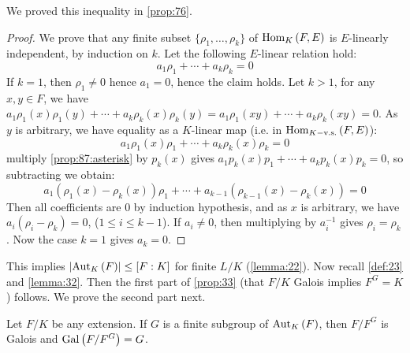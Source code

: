 We proved this inequality in \autoref{prop:76}.

\begin{proof}
  We prove that any finite subset $\{ \rho_1, \ldots, \rho_k \}$ of $\homset{F}{E}$ is $E$-linearly independent, by induction on $k$. Let the following $E$-linear relation hold: 
\[
a_1\rho_1 + \cdots + a_k\rho_k = 0 \tag{*} \label{prop:87:asterisk}
\] If $k = 1$, then $\rho_1 \neq 0$ hence $a_1 = 0$, hence the claim holds. Let $k > 1$, for any $x, y \in F$, we have $a_1\rho_1(x)\rho_1(y) + \cdots + a_k\rho_k(x)\rho_k(y) = a_1\rho_1(xy) + \cdots + a_k\rho_k(xy) = 0$. As $y$ is arbitrary, we have equality as a $K$-linear map (i.e. in $\homset[K-\text{v.s.}]{F}{E}$):
\[
a_1\rho_1(x)\rho_1 + \cdots + a_k\rho_k(x)\rho_k = 0
\]
multiply \eqref{prop:87:asterisk} by $p_k(x)$ gives $a_1p_k(x)p_1 + \cdots + a_kp_k(x)p_k = 0$, so subtracting we obtain:
\[
a_1(\rho_1(x)-\rho_k(x))\rho_1 + \cdots + a_{k-1}(\rho_{k-1}(x)-\rho_k(x)) = 0
\]
Then all coefficients are 0 by induction hypothesis, and as $x$ is arbitrary, we have $a_i(\rho_i -\rho_k) = 0$, ($1 \leq i \leq k-1$). If $a_i \neq 0$, then multiplying by $a_i^{-1}$ gives $\rho_i = \rho_k$. Now the case $k = 1$ gives $a_k = 0$.
\end{proof}

This implies $\card{\autset[K]{F}} \leq [F : K]$ for finite $L/K$ (\autoref{lemma:22}). Now recall \autoref{def:23} and \autoref{lemma:32}. Then the first part of \autoref{prop:33} (that $F/K$ Galois implies $F^G = K$) follows. We prove the second part next.

\begin{proposition}
  \label{prop:88}
  Let $F/K$ be any extension. If $G$ is a finite subgroup of $\autset[K]{F}$, then $F/F^G$ is Galois and $\Gal{F/F^G} = G$.
\end{proposition}

